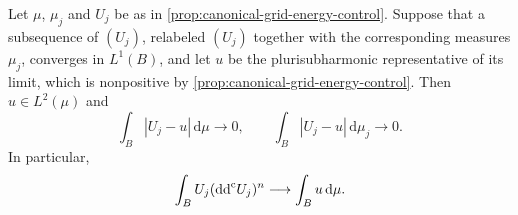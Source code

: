\begin{theorem}\label{thm:canonical-grid-self-integral-convergence}
Let $\mu$, $\mu_j$ and $U_j$ be as in \cref{prop:canonical-grid-energy-control}. Suppose that a subsequence of $(U_j)$, relabeled $(U_j)$ together with the corresponding measures $\mu_j$, converges in $L^1(B)$, and let $u$ be the plurisubharmonic representative of its limit, which is nonpositive by \cref{prop:canonical-grid-energy-control}. Then $u\in L^2(\mu)$ and
\begin{equation}\label{eq:canonical-grid-self-integral-convergence}
 \int_B|U_j-u|\,\mathrm d\mu\longrightarrow0,
 \qquad
 \int_B|U_j-u|\,\mathrm d\mu_j\longrightarrow0.
\end{equation}
In particular,
\[
 \int_B U_j(\mathrm{dd}^{\mathrm{c}} U_j)^n\longrightarrow\int_Bu\,\mathrm d\mu.
\]
\end{theorem}

